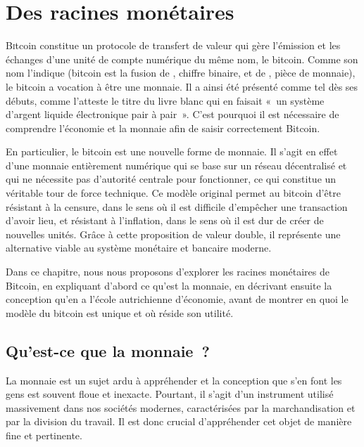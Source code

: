 
\chapter{Des racines monétaires}
\label{ch:monnaie}
\label{enotezch:3}

\lettrine[]{B}itcoin constitue un protocole de transfert de valeur qui gère l'émission et les échanges d'une unité de compte numérique du même nom, le bitcoin. Comme son nom l'indique (bitcoin est la fusion de , chiffre binaire, et de , pièce de monnaie), le bitcoin a vocation à être une monnaie. Il a ainsi été présenté comme tel dès ses débuts, comme l'atteste le titre du livre blanc qui en faisait «~un système d'argent liquide électronique pair à pair~». C'est pourquoi il est nécessaire de comprendre l'économie et la monnaie afin de saisir correctement Bitcoin.

En particulier, le bitcoin est une nouvelle forme de monnaie. Il s'agit en effet d'une monnaie entièrement numérique qui se base sur un réseau décentralisé et qui ne nécessite pas d'autorité centrale pour fonctionner, ce qui constitue un véritable tour de force technique. Ce modèle original permet au bitcoin d'être résistant à la censure, dans le sens où il est difficile d'empêcher une transaction d'avoir lieu, et résistant à l'inflation, dans le sens où il est dur de créer de nouvelles unités. Grâce à cette proposition de valeur double, il représente une alternative viable au système monétaire et bancaire moderne.

Dans ce chapitre, nous nous proposons d'explorer les racines monétaires de Bitcoin, en expliquant d'abord ce qu'est la monnaie, en décrivant ensuite la conception qu'en a l'école autrichienne d'économie, avant de montrer en quoi le modèle du bitcoin est unique et où réside son utilité.

\section*{Qu'est-ce que la monnaie~?}

La monnaie est un sujet ardu à appréhender et la conception que s'en font les gens est souvent floue et inexacte. Pourtant, il s'agit d'un instrument utilisé massivement dans nos sociétés modernes, caractérisées par la marchandisation et par la division du travail. Il est donc crucial d'appréhender cet objet de manière fine et pertinente.

